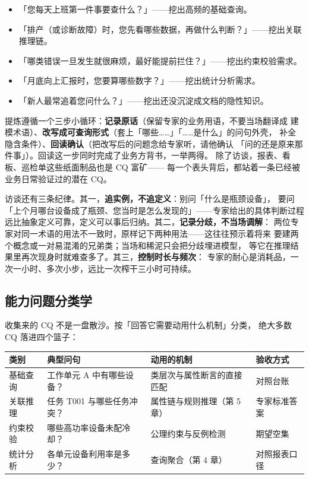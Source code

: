 \begin{itemize}
  \item 「您每天上班第一件事要查什么？」——挖出高频的基础查询。
  \item 「排产（或诊断故障）时，您先看哪些数据，再做什么判断？」——挖出关联推理链。
  \item 「哪类错误一旦发生就很麻烦，最好能提前拦住？」——挖出约束校验需求。
  \item 「月底向上汇报时，您要算哪些数字？」——挖出统计分析需求。
  \item 「新人最常追着您问什么？」——挖出还没沉淀成文档的隐性知识。
\end{itemize}

提炼遵循一个三步小循环：\textbf{记录原话}（保留专家的业务用语，不要当场翻译成
建模术语）、\textbf{改写成可查询形式}（套上「哪些……」「……是什么」的问句外壳，
补全隐含条件）、\textbf{回读确认}（把改写后的问题念给专家听，请他确认
「问的还是原来那件事」）。回读这一步同时完成了业务方背书，一举两得。
除了访谈，报表、看板、巡检单这些纸面制品也是 CQ 富矿——
每一个表头背后，都站着一条已经被业务日常验证过的潜在 CQ。

访谈还有三条纪律。其一，\textbf{追实例，不追定义}：别问「什么是瓶颈设备」，
要问「上个月哪台设备成了瓶颈、您当时是怎么发现的」——专家给出的具体判断过程
远比抽象定义可靠，定义可以事后归纳。其二，\textbf{记录分歧，不当场调解}：
两位专家对同一术语的用法不一致时，原样记下两种用法——这往往预示着将来
要建两个概念或一对易混淆的兄弟类；当场和稀泥只会把分歧埋进模型，
等它在推理结果里再次现身时就难查多了。其三，\textbf{控制时长与频次}：
专家的耐心是消耗品，一次一小时、多次小步，远比一次榨干三小时可持续。

\subsection{能力问题分类学}

收集来的 CQ 不是一盘散沙。按「回答它需要动用什么机制」分类，
绝大多数 CQ 落进四个篮子：

\begin{center}
\begin{tabularx}{\linewidth}{@{}lXXl@{}}
\toprule
\textbf{类别} & \textbf{典型问句} & \textbf{动用的机制} & \textbf{验收方式} \\
\midrule
基础查询 & 工作单元 A 中有哪些设备？ & 类层次与属性断言的直接匹配 & 对照台账 \\
关联推理 & 任务 T001 与哪些任务冲突？ & 属性链与规则推理（第 5 章） & 专家标准答案 \\
约束校验 & 哪些高功率设备未配冷却？ & 公理约束与反例检测 & 期望空集 \\
统计分析 & 各单元设备利用率是多少？ & 查询聚合（第 4 章） & 对照报表口径 \\
\bottomrule
\end{tabularx}
\end{center}

